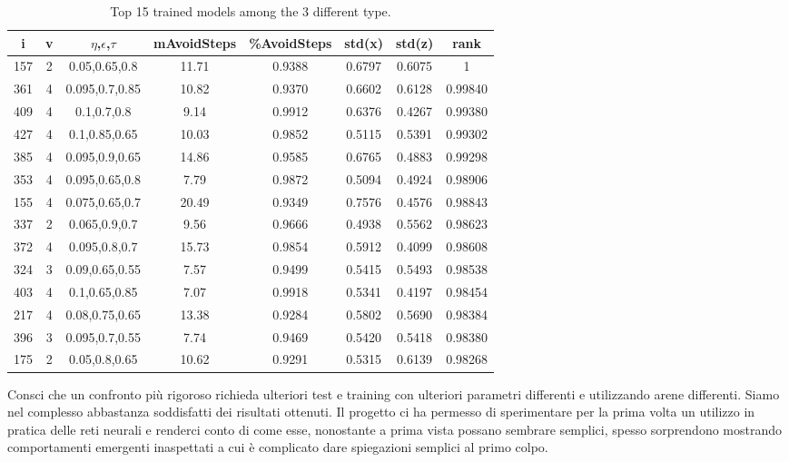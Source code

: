 \begin{table}[H]
    \centering
    \begin{tabular}{|c|c|c|c|c|c|c|c|}
        \hline
        i	&   v	&	$\eta$,$\epsilon$,$\tau$ &   mAvoidSteps	& \%AvoidSteps & std(x) & std(z) & rank \\
        \hline
        157	    &   2	    &	0.05,0.65,0.8     &   11.71	&   0.9388	&   0.6797	&   0.6075	& 1 \\
        361	    &   4	    &	0.095,0.7,0.85 	&   10.82	&   0.9370	&   0.6602	&   0.6128	& 0.99840 \\
        409	    &   4	    &	0.1,0.7,0.8       &   9.14	&   0.9912	&   0.6376	&   0.4267	& 0.99380 \\
        427	    &   4	    &	0.1,0.85,0.65   	&   10.03	&   0.9852	&   0.5115	&   0.5391	& 0.99302 \\
        385	    &   4	    &	0.095,0.9,0.65   	&   14.86	&   0.9585	&   0.6765	&   0.4883	& 0.99298 \\
        353	    &   4	    &	0.095,0.65,0.8    &   7.79	&   0.9872	&   0.5094	&   0.4924	& 0.98906 \\
        155	    &   4	    &	0.075,0.65,0.7    &   20.49	&   0.9349	&   0.7576	&   0.4576	& 0.98843 \\
        337	    &   2	    &	0.065,0.9,0.7     &   9.56	&   0.9666	&   0.4938	&   0.5562	& 0.98623 \\
        372	    &   4	    &	0.095,0.8,0.7     &   15.73	&   0.9854	&   0.5912	&   0.4099	& 0.98608 \\
        324	    &   3	    &	0.09,0.65,0.55   	&   7.57	&   0.9499	&   0.5415	&   0.5493	& 0.98538 \\
        403	    &   4	    &	0.1,0.65,0.85   	&   7.07	&   0.9918	&   0.5341	&   0.4197	& 0.98454 \\
        217	    &   4	    &	0.08,0.75,0.65   	&   13.38	&   0.9284	&   0.5802	&   0.5690	& 0.98384 \\
        396	    &   3	    &	0.095,0.7,0.55   	&   7.74	&   0.9469	&   0.5420	&   0.5418	& 0.98380 \\
        175	    &   2	    &	0.05,0.8,0.65   	&   10.62	&   0.9291	&   0.5315	&   0.6139	& 0.98268 \\
        \hline
    \end{tabular}
    \caption{Top 15 trained models among the 3 different type.}
    \label{tab:ranks}
\end{table}

Consci che un confronto più rigoroso richieda ulteriori test e training con ulteriori parametri differenti e utilizzando arene differenti. Siamo nel complesso abbastanza soddisfatti dei risultati ottenuti. 
Il progetto ci ha permesso di sperimentare per la prima volta un utilizzo in pratica delle reti neurali e renderci conto di come esse, nonostante a prima vista possano sembrare semplici, spesso sorprendono mostrando comportamenti emergenti inaspettati a cui è complicato dare spiegazioni semplici al primo colpo.  